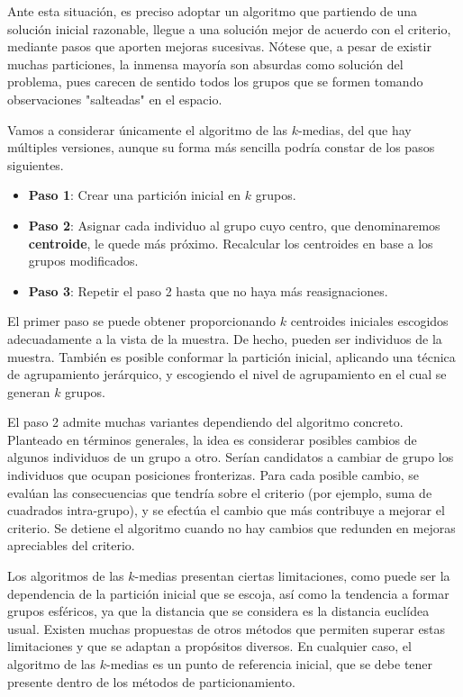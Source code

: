\documentclass[
  a4paper,
  oneside]{scrbook}
\theoremstyle{definition}
\theoremstyle{definition}
\theoremstyle{definition}
\theoremstyle{definition}
\theoremstyle{remark}
\begin{document}
Ante esta situación, es preciso adoptar un algoritmo que partiendo de
una solución inicial razonable, llegue a una solución mejor de acuerdo
con el criterio, mediante pasos que aporten mejoras sucesivas. Nótese
que, a pesar de existir muchas particiones, la inmensa mayoría son
absurdas como solución del problema, pues carecen de sentido todos los
grupos que se formen tomando observaciones "salteadas" en el espacio.

Vamos a considerar únicamente el algoritmo de las \(k\)-medias, del que
hay múltiples versiones, aunque su forma más sencilla podría constar de
los pasos siguientes.

\begin{itemize}
\item
  \textbf{Paso 1}: Crear una partición inicial en \(k\) grupos.
\item
  \textbf{Paso 2}: Asignar cada individuo al grupo cuyo centro, que
  denominaremos \textbf{centroide}, le quede más próximo. Recalcular los
  centroides en base a los grupos modificados.
\item
  \textbf{Paso 3}: Repetir el paso 2 hasta que no haya más reasignaciones.
\end{itemize}

El primer paso se puede obtener proporcionando \(k\) centroides iniciales
escogidos adecuadamente a la vista de la muestra. De hecho, pueden ser
individuos de la muestra. También es posible conformar la partición
inicial, aplicando una técnica de agrupamiento jerárquico, y escogiendo
el nivel de agrupamiento en el cual se generan \(k\) grupos.

El paso 2 admite muchas variantes dependiendo del algoritmo concreto.
Planteado en términos generales, la idea es considerar posibles cambios
de algunos individuos de un grupo a otro. Serían candidatos a cambiar de
grupo los individuos que ocupan posiciones fronterizas. Para cada
posible cambio, se evalúan las consecuencias que tendría sobre el
criterio (por ejemplo, suma de cuadrados intra-grupo), y se efectúa el
cambio que más contribuye a mejorar el criterio. Se detiene el algoritmo
cuando no hay cambios que redunden en mejoras apreciables del criterio.

Los algoritmos de las \(k\)-medias presentan ciertas limitaciones, como
puede ser la dependencia de la partición inicial que se escoja, así como
la tendencia a formar grupos esféricos, ya que la distancia que se
considera es la distancia euclídea usual. Existen muchas propuestas de
otros métodos que permiten superar estas limitaciones y que se adaptan a
propósitos diversos. En cualquier caso, el algoritmo de las \(k\)-medias
es un punto de referencia inicial, que se debe tener presente dentro de
los métodos de particionamiento.
\end{document}
